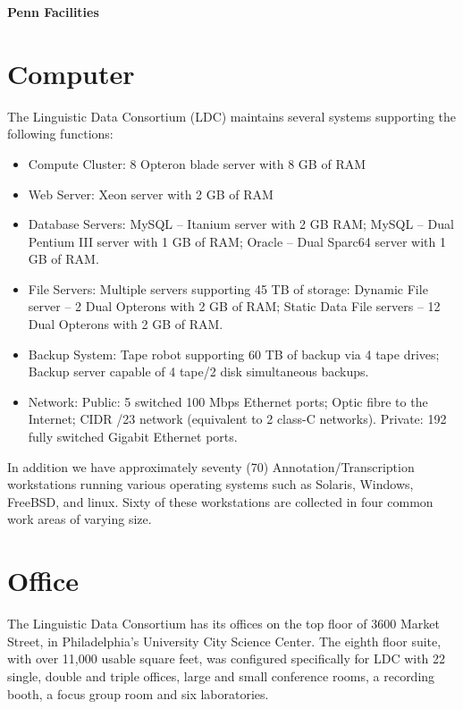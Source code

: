 \documentclass[11pt]{nsf}
\begin{document}
\begin{center}\textbf{\Large Penn Facilities}\end{center}

\section*{Computer}

The Linguistic Data Consortium (LDC) maintains several systems
supporting the following functions:

\begin{itemize}
\item Compute Cluster: 8 Opteron blade server with 8 GB of RAM
\item Web Server: Xeon server with 2 GB of RAM
\item Database Servers:
        MySQL -- Itanium server with 2 GB RAM;
        MySQL -- Dual Pentium III server with 1 GB of RAM;
        Oracle -- Dual Sparc64 server with 1 GB of RAM.
\item File Servers: Multiple servers supporting 45 TB of storage:
        Dynamic File server -- 2 Dual Opterons with 2 GB of RAM;
        Static Data File servers -- 12 Dual Opterons with 2 GB of RAM.
\item Backup System:
        Tape robot supporting 60 TB of backup via 4 tape drives;
        Backup server capable of 4 tape/2 disk simultaneous backups.
\item Network:
        Public:
               5 switched 100 Mbps Ethernet ports;
               Optic fibre to the Internet;
               CIDR /23 network (equivalent to 2 class-C networks).
        Private: 192 fully switched Gigabit Ethernet ports.
\end{itemize}

In addition we have approximately seventy (70)
Annotation/Transcription workstations running various operating
systems such as Solaris, Windows, FreeBSD, and linux. Sixty of these
workstations are collected in four common work areas of varying size.

\section*{Office}

The Linguistic Data Consortium has its offices on the top floor of
3600 Market Street, in Philadelphia's University City Science
Center. The eighth floor suite, with over 11,000 usable square feet,
was configured specifically for LDC with 22 single, double and triple
offices, large and small conference rooms, a recording booth, a focus
group room and six laboratories.
\end{document}
